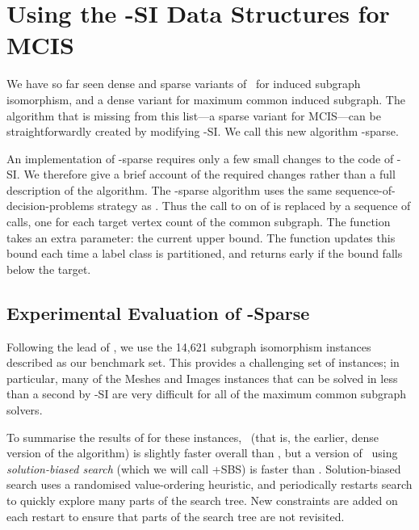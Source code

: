 \section{Using the \McSplit-SI Data Structures for MCIS}\label{sec:mcsplit-sparse}

We have so far seen dense and sparse variants of \McSplit\ for induced subgraph isomorphism, and
a dense variant for maximum common induced subgraph.  The algorithm that is missing from this
list---a sparse variant for MCIS---can be straightforwardly created by modifying \McSplit-SI. 
We call this new algorithm \McSplit-sparse.

An implementation of \McSplit-sparse
requires only a few small changes to the code of \McSplit-SI. We
therefore give a brief account of the required changes rather than a full
description of the algorithm.  The \McSplit-sparse algorithm uses the same
sequence-of-decision-problems strategy as \McSplitDown. Thus the call to
 on  of 
is replaced by a sequence of calls, one for each target
vertex count of the common
subgraph.  The  function takes an extra parameter: the current
upper bound. The  function updates this bound each time a label
class is partitioned, and returns early if the bound falls below the target.

\subsection{Experimental Evaluation of \McSplit-Sparse}

Following the lead of \cite{DBLP:conf/cpaior/ArchibaldDHMP019},
we use the 14,621 subgraph isomorphism instances described
 as our benchmark set.
This provides a challenging set of instances; in particular,
many of the Meshes and Images instances that can be solved in less
than a second by \McSplit-SI are very difficult for all of the maximum
common subgraph solvers.

To summarise the results of \cite{DBLP:conf/cpaior/ArchibaldDHMP019}
for these instances, \McSplitDown\ (that is, the earlier, dense version
of the algorithm) is slightly faster overall than
\kDown, but a version of \kDown\ using \emph{solution-biased
search} (which we will call \kDown+SBS) is faster than
\McSplitDown.  Solution-biased search uses a randomised value-ordering
heuristic, and periodically restarts search to quickly
explore many parts of the search tree.  New constraints are added
on each restart to ensure that parts of the search tree are not
revisited.

